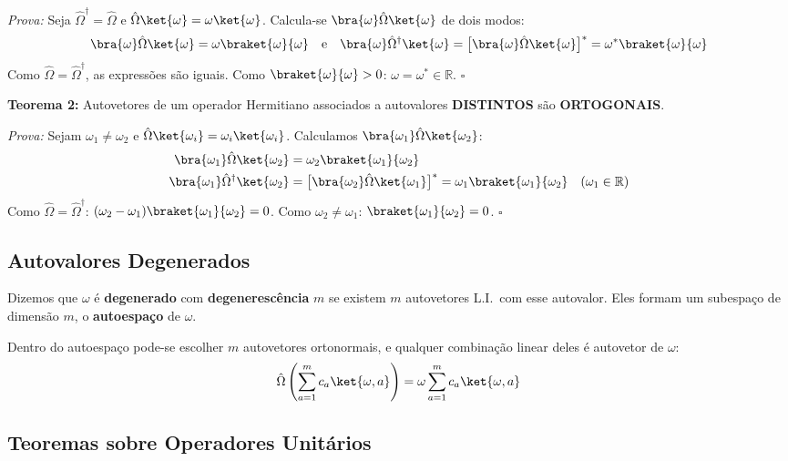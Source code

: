 \textit{Prova:} Seja $\hat{\Omega}^\dagger = \hat{\Omega}$ e $\hat{\Omega}\ket{\omega} = \omega\ket{\omega}$. Calcula-se $\bra{\omega}\hat{\Omega}\ket{\omega}$ de dois modos:
\[
    \bra{\omega}\hat{\Omega}\ket{\omega} = \omega\braket{\omega}{\omega}
    \quad\text{e}\quad
    \bra{\omega}\hat{\Omega}^\dagger\ket{\omega} = \bigl[\bra{\omega}\hat{\Omega}\ket{\omega}\bigr]^* = \omega^*\braket{\omega}{\omega}
\]
Como $\hat{\Omega} = \hat{\Omega}^\dagger$, as expressões são iguais. Como $\braket{\omega}{\omega} > 0$: $\omega = \omega^* \in \mathbb{R}$. $\square$

\begin{shadequote}
    \textbf{Teorema 2:} Autovetores de um operador Hermitiano associados a autovalores \textbf{DISTINTOS} são \textbf{ORTOGONAIS}.
\end{shadequote}

\textit{Prova:} Sejam $\omega_1 \neq \omega_2$ e $\hat{\Omega}\ket{\omega_i} = \omega_i\ket{\omega_i}$. Calculamos $\bra{\omega_1}\hat{\Omega}\ket{\omega_2}$:
\begin{align*}
    \bra{\omega_1}\hat{\Omega}\ket{\omega_2} &= \omega_2\braket{\omega_1}{\omega_2} \\
    \bra{\omega_1}\hat{\Omega}^\dagger\ket{\omega_2} &= \bigl[\bra{\omega_2}\hat{\Omega}\ket{\omega_1}\bigr]^* = \omega_1\braket{\omega_1}{\omega_2}
    \quad (\omega_1 \in \mathbb{R})
\end{align*}
Como $\hat{\Omega} = \hat{\Omega}^\dagger$: $(\omega_2 - \omega_1)\braket{\omega_1}{\omega_2} = 0$. Como $\omega_2 \neq \omega_1$: $\braket{\omega_1}{\omega_2} = 0$. $\square$

\subsection*{Autovalores Degenerados}

Dizemos que $\omega$ é \textbf{degenerado} com \textbf{degenerescência} $m$ se existem $m$ autovetores L.I.\ com esse autovalor. Eles formam um subespaço de dimensão $m$, o \textbf{autoespaço} de $\omega$.

Dentro do autoespaço pode-se escolher $m$ autovetores ortonormais, e qualquer combinação linear deles é autovetor de $\omega$:
\begin{equation}
    \hat{\Omega}\left(\sum_{a=1}^m c_a\ket{\omega,a}\right) = \omega\sum_{a=1}^m c_a\ket{\omega,a}
\end{equation}

\subsection*{Teoremas sobre Operadores Unitários}

